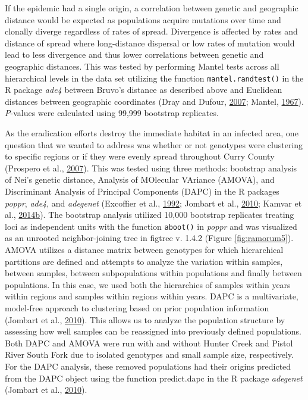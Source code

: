 \documentclass[double,12pt]{beavtex}
\begin{document}
  If the epidemic had a single origin, a correlation between genetic and
  geographic distance would be expected as populations acquire mutations
  over time and clonally diverge regardless of rates of spread. Divergence
  is affected by rates and distance of spread where long-distance
  dispersal or low rates of mutation would lead to less divergence and
  thus lower correlations between genetic and geographic distances. This
  was tested by performing Mantel tests across all hierarchical levels in
  the data set utilizing the function \texttt{mantel.randtest()} in the R
  package \emph{ade4} between Bruvo's distance as described above and
  Euclidean distances between geographic coordinates (Dray and Dufour,
  \protect\hyperlink{ref-dray2007ade4}{2007}; Mantel,
  \protect\hyperlink{ref-mantel1967detection}{1967}). \emph{P}-values were
  calculated using 99,999 bootstrap replicates.
  
  As the eradication efforts destroy the immediate habitat in an infected
  area, one question that we wanted to address was whether or not
  genotypes were clustering to specific regions or if they were evenly
  spread throughout Curry County (Prospero et al.,
  \protect\hyperlink{ref-prospero2007population}{2007}). This was tested
  using three methods: bootstrap analysis of Nei's genetic distance,
  Analysis of MOlecular VAriance (AMOVA), and Discriminant Analysis of
  Principal Components (DAPC) in the R packages \emph{poppr}, \emph{ade4},
  and \emph{adegenet} (Excoffier et al.,
  \protect\hyperlink{ref-excoffier1992analysis}{1992}; Jombart et al.,
  \protect\hyperlink{ref-jombart2010discriminant}{2010}; Kamvar et al.,
  \protect\hyperlink{ref-kamvar2014poppr}{2014}\protect\hyperlink{ref-kamvar2014poppr}{b}).
  The bootstrap analysis utilized 10,000 bootstrap replicates treating
  loci as independent units with the function \texttt{aboot()} in
  \emph{poppr} and was visualized as an unrooted neighbor-joining tree in
  figtree v. 1.4.2 (Figure \ref{fig:ramorum5}). AMOVA utilizes a distance
  matrix between genotypes for which hierarchical partitions are defined
  and attempts to analyze the variation within samples, between samples,
  between subpopulations within populations and finally between
  populations. In this case, we used both the hierarchies of samples
  within years within regions and samples within regions within years.
  DAPC is a multivariate, model-free approach to clustering based on prior
  population information (Jombart et al.,
  \protect\hyperlink{ref-jombart2010discriminant}{2010}). This allows us
  to analyze the population structure by assessing how well samples can be
  reassigned into previously defined populations. Both DAPC and AMOVA were
  run with and without Hunter Creek and Pistol River South Fork due to
  isolated genotypes and small sample size, respectively. For the DAPC
  analysis, these removed populations had their origins predicted from the
  DAPC object using the function predict.dapc in the R package
  \emph{adegenet} (Jombart et al.,
  \protect\hyperlink{ref-jombart2010discriminant}{2010}).
  
\end{document}
